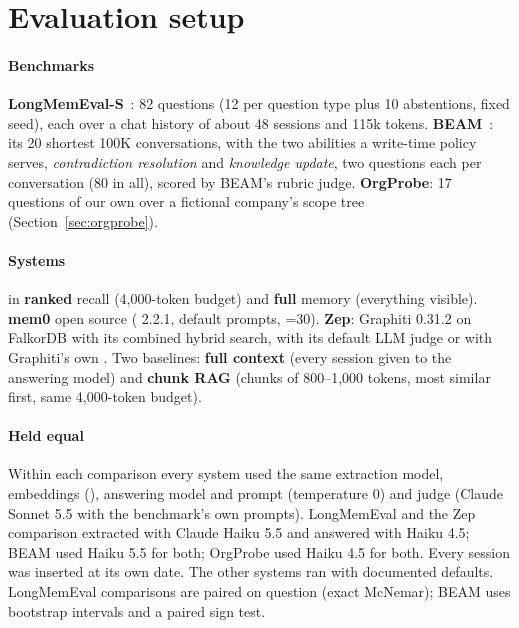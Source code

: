 \section{Evaluation setup}\label{sec:eval}

\paragraph{Benchmarks} \textbf{LongMemEval-S}~\cite{longmemeval}: 82 questions (12 per question type plus 10
abstentions, fixed seed), each over a chat history of about 48 sessions and 115k tokens. \textbf{BEAM}~\cite{beam}: its 20
shortest 100K conversations, with the two abilities a write-time policy serves, \emph{contradiction resolution} and
\emph{knowledge update}, two questions each per conversation (80 in all), scored by BEAM's rubric judge.
\textbf{OrgProbe}: 17 questions of our own over a fictional company's scope tree (Section~\ref{sec:orgprobe}).

\paragraph{Systems} \textbf{\mx{}} in \textbf{ranked} recall (4,000-token budget) and \textbf{full} memory (everything
visible). \textbf{mem0} open source ( 2.2.1, default prompts, =30). \textbf{Zep}: Graphiti
0.31.2 on FalkorDB with its combined hybrid search, with its default LLM judge or with Graphiti's own .
Two baselines: \textbf{full context} (every session given to the answering model) and \textbf{chunk RAG} (chunks of
800--1,000 tokens, most similar first, same 4,000-token budget).

\paragraph{Held equal} Within each comparison every system used the same extraction model, embeddings
(), answering model and prompt (temperature 0) and judge (Claude Sonnet 5.5 with the
benchmark's own prompts). LongMemEval and the Zep comparison extracted with Claude Haiku 5.5 and answered with Haiku
4.5; BEAM used Haiku 5.5 for both; OrgProbe used Haiku 4.5 for both. Every session was inserted at its
own date. The other systems ran with documented defaults. LongMemEval comparisons are paired on question (exact
McNemar); BEAM uses bootstrap intervals and a paired sign test.


